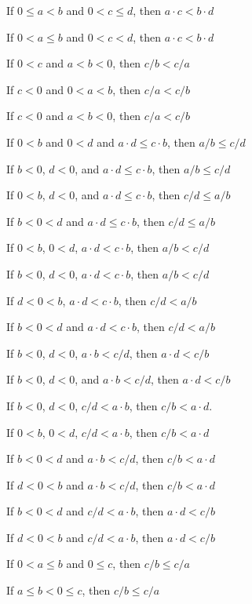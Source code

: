 \documentclass{article}
\begin{document}
\begin{thm}
\item\label{xreal1:97} If $0\leq a<b$ and $0<c\leq d$, then
  $a\cdot c<b\cdot d$
\item\label{xreal1:98} If $0<a\leq b$ and $0<c<d$, then
  $a\cdot c<b\cdot d$
\item\label{xreal1:99} If $0<c$ and $a<b<0$, then $c/b<c/a$
\item\label{xreal1:100} If $c<0$ and $0<a<b$, then $c/a<c/b$
\item\label{xreal1:101} If $c<0$ and $a<b<0$, then $c/a<c/b$
\item\label{xreal1:102} If $0<b$ and $0<d$ and $a\cdot d\leq c\cdot b$,
  then $a/b\leq c/d$
\item\label{xreal1:103} If $b<0$, $d<0$, and $a\cdot d\leq c\cdot b$,
  then $a/b\leq c/d$
\item\label{xreal1:104} If $0<b$, $d<0$, and $a\cdot d\leq c\cdot b$,
  then $c/d\leq a/b$
\item\label{xreal1:105} If $b<0<d$ and $a\cdot d\leq c\cdot b$,
  then $c/d\leq a/b$
\item\label{xreal1:106} If $0<b$, $0<d$, $a\cdot d<c\cdot b$, then $a/b<c/d$
\item\label{xreal1:107} If $b<0$, $d<0$, $a\cdot d<c\cdot b$,
  then $a/b<c/d$
\item\label{xreal1:108} If $d<0<b$, $a\cdot d<c\cdot b$, then $c/d<a/b$
\item\label{xreal1:109} If $b<0<d$ and $a\cdot d<c\cdot b$, then $c/d<a/b$
\item\label{xreal1:110} If $b<0$, $d<0$, $a\cdot b<c/d$, then $a\cdot d<c/b$
\item\label{xreal1:111} If $b<0$, $d<0$, and $a\cdot b<c/d$, then
  $a\cdot d<c/b$
\item\label{xreal1:112} If $b<0$, $d<0$, $c/d<a\cdot b$, then
  $c/b<a\cdot d$.
\item\label{xreal1:113} If $0<b$, $0<d$, $c/d<a\cdot b$, then
  $c/b<a\cdot d$
\item\label{xreal1:114} If $b<0<d$ and $a\cdot b<c/d$, then $c/b<a\cdot d$
\item\label{xreal1:115} If $d<0<b$ and $a\cdot b<c/d$, then $c/b<a\cdot d$
\item\label{xreal1:116} If $b<0<d$ and $c/d<a\cdot b$, then $a\cdot d<c/b$
\item\label{xreal1:117} If $d<0<b$ and $c/d<a\cdot b$, then $a\cdot d<c/b$
\item\label{xreal1:118} If $0<a\leq b$ and $0\leq c$, then $c/b\leq c/a$ 
\item\label{xreal1:119} If $a\leq b<0\leq c$, then $c/b\leq c/a$

\end{thm}
\end{document}
